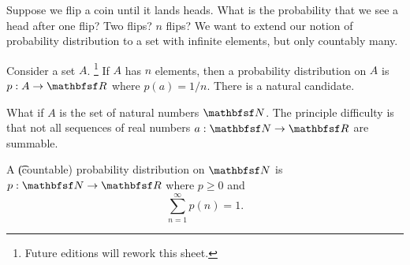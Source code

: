 

Suppose we flip a coin until it lands heads.
What is the probability that we see a head after one flip?
Two flips?
$n$ flips?
We want to extend our notion of probability distribution to a set with infinite elements, but only countably many.


Consider a set $A$.
  \ifhmode\unskip\fi\footnote{
Future editions will rework this sheet.
  }
If $A$ has $n$ elements, then a probability distribution on $A$ is $p: A \to \R $ where $p(a) = 1/n$.
There is a natural candidate.

What if $A$ is the set of natural numbers $\N $.
The principle difficulty is that not all sequences
of real numbers $a: \N  \to \R $ are summable.

A \t{(countable) probability distribution} on $\N $ is $p: \N \to \R $ where $p \geq 0$ and
  \[
\textstyle
\sum_{n =1}^{\infty} p(n) = 1.
  \]

\blankpage
